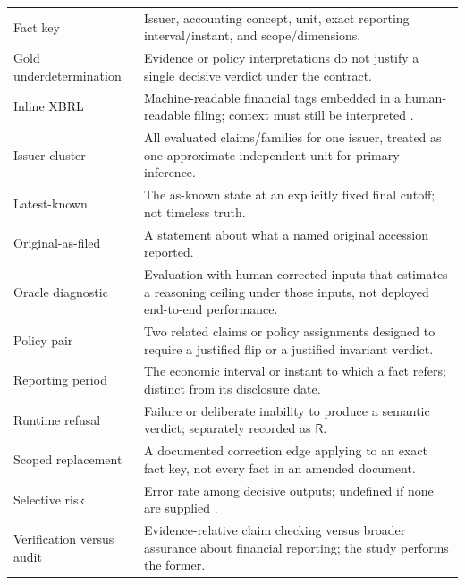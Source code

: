 \documentclass[11pt,a4paper]{article}
\newcommand{\pbreak}{\clearpage}
\newcommand{\Rlabel}{\mathsf{R}}
\begin{document}
\begin{table}[H]
\begin{tabularx}{\linewidth}{p{.27\linewidth}Y}
Fact key & Issuer, accounting concept, unit, exact reporting interval/instant, and scope/dimensions.\\
Gold underdetermination & Evidence or policy interpretations do not justify a single decisive verdict under the contract.\\
Inline XBRL & Machine-readable financial tags embedded in a human-readable filing; context must still be interpreted \cite{sec}.\\
Issuer cluster & All evaluated claims/families for one issuer, treated as one approximate independent unit for primary inference.\\
Latest-known & The as-known state at an explicitly fixed final cutoff; not timeless truth.\\
Original-as-filed & A statement about what a named original accession reported.\\
Oracle diagnostic & Evaluation with human-corrected inputs that estimates a reasoning ceiling under those inputs, not deployed end-to-end performance.\\
Policy pair & Two related claims or policy assignments designed to require a justified flip or a justified invariant verdict.\\
Reporting period & The economic interval or instant to which a fact refers; distinct from its disclosure date.\\
Runtime refusal & Failure or deliberate inability to produce a semantic verdict; separately recorded as $\Rlabel$.\\
Scoped replacement & A documented correction edge applying to an exact fact key, not every fact in an amended document.\\
Selective risk & Error rate among decisive outputs; undefined if none are supplied \cite{selective}.\\
Verification versus audit & Evidence-relative claim checking versus broader assurance about financial reporting; the study performs the former.\\\bottomrule
\end{tabularx}\end{table}

\pbreak
\end{document}
